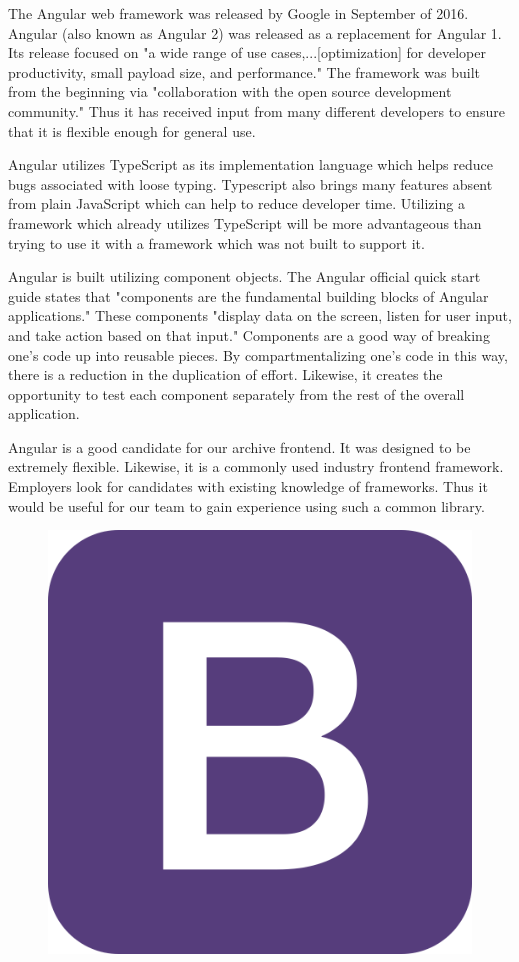 \documentclass[12pt]{report}
\begin{document}
\begin{enumerate}
The Angular web framework was released by Google in September of 2016.\cite{angularrelease} Angular (also known as Angular 2) was released as a replacement for Angular 1. Its release focused on "a wide range of use cases,...[optimization] for developer productivity, small payload size, and performance."\cite{angularrelease} The framework was built from the beginning via "collaboration with the open source development community."\cite{angularrelease} Thus it has received input from many different developers to ensure that it is flexible enough for general use.

Angular utilizes TypeScript as its implementation language which helps reduce bugs associated with loose typing. Typescript also brings many features absent from plain JavaScript which can help to reduce developer time. Utilizing a framework which already utilizes TypeScript will be more advantageous than trying to use it with a framework which was not built to support it.

Angular is built utilizing component objects. The Angular official quick start guide states that "components are the fundamental building blocks of Angular applications."\cite{angularquickstart} These components "display data on the screen, listen for user input, and take action based on that input."\cite{angularquickstart} Components are a good way of breaking one's code up into reusable pieces. By compartmentalizing one's code in this way, there is a reduction in the duplication of effort. Likewise, it creates the opportunity to test each component separately from the rest of the overall application.

Angular is a good candidate for our archive frontend. It was designed to be extremely flexible. Likewise, it is a commonly used industry frontend framework. Employers look for candidates with existing knowledge of frameworks. Thus it would be useful for our team to gain experience using such a common library.

\begin{figure}[h]
	\centering
	\includegraphics[width=0.25\linewidth]{bootstrap}
\end{figure}


\end{enumerate}
\end{document}

